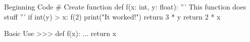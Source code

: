 
\begin{codebox}{\linewidth}{Beginning Code}
# Create function
def f(x: int, y: float):
    '''
    This function does stuff
    '''
    if int(y) > x:
        f(2)
        print("It worked!")
        return 3 * y
    return 2 * x
\end{codebox}


\begin{pyshell}{\linewidth}{Basic Use}
>>> def f(x):
...     return x    
\end{pyshell}

